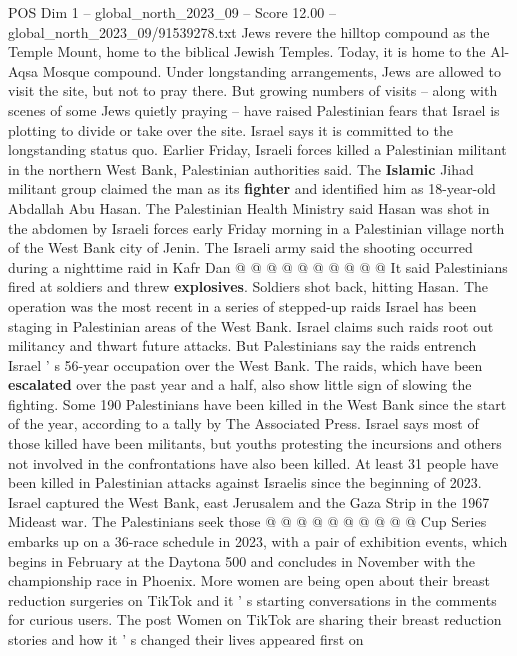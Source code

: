 \begin{textsample}{POS Dim 1 – global\_north\_2023\_09 – Score 12.00 – global\_north\_2023\_09/91539278.txt}
Jews revere the hilltop compound as the Temple Mount, home to the biblical Jewish Temples.
Today, it is home to the Al-Aqsa Mosque compound.
Under longstanding arrangements, Jews are allowed to visit the site, but not to pray there.
But growing numbers of visits -- along with scenes of some Jews quietly praying -- have raised Palestinian fears that Israel is plotting to divide or take over the site.
Israel says it is committed to the longstanding status quo.
Earlier Friday, Israeli forces killed a Palestinian militant in the northern West Bank, Palestinian authorities said.
The \textbf{Islamic} Jihad militant group claimed the man as its \textbf{fighter} and identified him as 18-year-old Abdallah Abu Hasan.
The Palestinian Health Ministry said Hasan was shot in the abdomen by Israeli forces early Friday morning in a Palestinian village north of the West Bank city of Jenin.
The Israeli army said the shooting occurred during a nighttime raid in Kafr Dan @ @ @ @ @ @ @ @ @ @ It said Palestinians fired at soldiers and threw \textbf{explosives}.
Soldiers shot back, hitting Hasan.
The operation was the most recent in a series of stepped-up raids Israel has been staging in Palestinian areas of the West Bank.
Israel claims such raids root out militancy and thwart future attacks.
But Palestinians say the raids entrench Israel ' s 56-year occupation over the West Bank.
The raids, which have been \textbf{escalated} over the past year and a half, also show little sign of slowing the fighting.
Some 190 Palestinians have been killed in the West Bank since the start of the year, according to a tally by The Associated Press.
Israel says most of those killed have been militants, but youths protesting the incursions and others not involved in the confrontations have also been killed.
At least 31 people have been killed in Palestinian attacks against Israelis since the beginning of 2023.
Israel captured the West Bank, east Jerusalem and the Gaza Strip in the 1967 Mideast war.
The Palestinians seek those @ @ @ @ @ @ @ @ @ @ Cup Series embarks up on a 36-race schedule in 2023, with a pair of exhibition events, which begins in February at the Daytona 500 and concludes in November with the championship race in Phoenix.
More women are being open about their breast reduction surgeries on TikTok and it ' s starting conversations in the comments for curious users.
The post Women on TikTok are sharing their breast reduction stories and how it ' s changed their lives appeared first on

\end{textsample}
